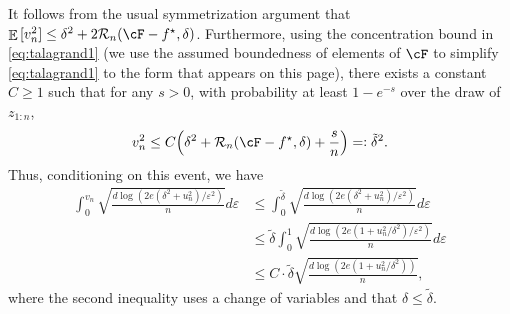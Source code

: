 \documentclass[11pt]{article} %
\newcommand{\pref}[1]{\cref{#1}}
\theoremstyle{theorem}  %
\theoremstyle{plain}
\DeclarePairedDelimiter{\brk}{[}{]}
\DeclarePairedDelimiter{\prn}{(}{)}
\DeclareMathOperator{\En}{\mathbb{E}}
\newcommand{\veps}{\varepsilon}
\newcommand{\rdef}{=\vcentcolon}
\newcommand{\zr}[1][n]{z_{1:#1}}
\newcommand{\Radexp}{\mathcal{R}_n}
\begin{document}
It follows from the usual symmetrization argument that $\En{}\brk{v_n^{2}}\leq{}\delta^{2} + 2\Radexp(\cF-f^{\star},\delta)$. Furthermore, using the concentration bound in \pref{eq:talagrand1} (we use the assumed boundedness of elements of $\cF$ to simplify \pref{eq:talagrand1} to the form that appears on this page), there exists a constant $C\geq{}1$ such that for any $s>0$, with probability at least $1-e^{-s}$ over the draw of $\zr[n]$,
\[
v_{n}^{2} \leq{} C\prn*{\delta^{2} + \Radexp(\cF-f^{\star},\delta) + \frac{s}{n}} \rdef{} \tilde{\delta}^{2}.
\]
Thus, conditioning on this event, we have
\begin{align*}
\int_{0}^{v_n} \sqrt{\frac{d\log(2e(\delta^{2}+u_{n}^{2})/\veps^{2})}{n}} d\veps 
&\leq{}\int_{0}^{\tilde{\delta}} \sqrt{\frac{d\log(2e(\delta^{2}+u_{n}^{2})/\veps^{2})}{n}} d\veps\\
&\leq{}\tilde{\delta}\int_{0}^{1} \sqrt{\frac{d\log(2e(1+u_{n}^{2}/\delta^{2})/\veps^{2})}{n}} d\veps\\
&\leq{}C\cdot{}\tilde{\delta}\sqrt{\frac{d\log(2e(1+u_{n}^{2}/\delta^{2}))}{n}},
\end{align*}
where the second inequality uses a change of variables and that $\delta\leq{}\tilde{\delta}$. 
\end{document}
